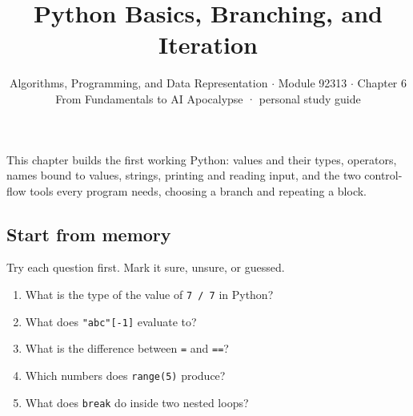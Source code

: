 \documentclass[11pt]{article}
\title{\sffamily\bfseries\color{FAUblue}Python Basics, Branching, and Iteration}
\author{Algorithms, Programming, and Data Representation \ensuremath{\cdot} Module 92313 \ensuremath{\cdot} Chapter 6\\[2pt]\small From Fundamentals to AI Apocalypse · personal study guide}
\date{}
\begin{document}
\maketitle
\begingroup\footnotesize\setlength{\parskip}{0pt}\tableofcontents\endgroup
\clearpage

{\large This chapter builds the first working Python: values and their types, operators, names bound to values, strings, printing and reading input, and the two control-flow tools every program needs, choosing a branch and repeating a block.}


\begin{keepsection}
\section{Start from memory}

Try each question first. Mark it sure, unsure, or guessed.

\begin{enumerate}
\item What is the type of the value of \texttt{7 / 7} in Python?
\item What does \texttt{"abc"[-1]} evaluate to?
\item What is the difference between \texttt{=} and \texttt{==}?
\item Which numbers does \texttt{range(5)} produce?
\item What does \texttt{break} do inside two nested loops?
\end{enumerate}

\end{keepsection}
\end{document}
